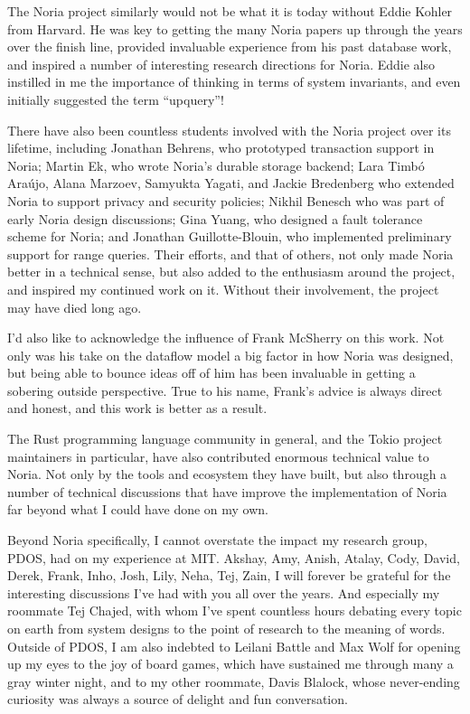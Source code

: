 
The Noria project similarly would not be what it is today without Eddie Kohler
from Harvard. He was key to getting the many Noria papers up through the years
over the finish line, provided invaluable experience from his past database
work, and inspired a number of interesting research directions for Noria. Eddie
also instilled in me the importance of thinking in terms of system invariants,
and even initially suggested the term ``upquery''!

There have also been countless students involved with the Noria project over its
lifetime, including Jonathan Behrens, who prototyped transaction support in
Noria; Martin Ek, who wrote Noria's durable storage backend; Lara Timb\'{o}
Ara\'{u}jo, Alana Marzoev, Samyukta Yagati, and Jackie Bredenberg who extended
Noria to support privacy and security policies; Nikhil Benesch who was part of
early Noria design discussions; Gina Yuang, who designed a fault tolerance
scheme for Noria; and Jonathan Guillotte-Blouin, who implemented preliminary
support for range queries. Their efforts, and that of others, not only made
Noria better in a technical sense, but also added to the enthusiasm around the
project, and inspired my continued work on it. Without their involvement, the
project may have died long ago.

I'd also like to acknowledge the influence of Frank McSherry on this work. Not
only was his take on the dataflow model a big factor in how Noria was designed,
but being able to bounce ideas off of him has been invaluable in getting a
sobering outside perspective. True to his name, Frank's advice is always direct
and honest, and this work is better as a result.

The Rust programming language community in general, and the Tokio project
maintainers in particular, have also contributed enormous technical value to
Noria. Not only by the tools and ecosystem they have built, but also through a
number of technical discussions that have improve the implementation of Noria
far beyond what I could have done on my own.

Beyond Noria specifically, I cannot overstate the impact my research group,
PDOS, had on my experience at MIT. Akshay, Amy, Anish, Atalay, Cody, David,
Derek, Frank, Inho, Josh, Lily, Neha, Tej, Zain, I will forever be grateful for
the interesting discussions I've had with you all over the years. And especially
my roommate Tej Chajed, with whom I've spent countless hours debating every
topic on earth from system designs to the point of research to the meaning of
words. Outside of PDOS, I am also indebted to Leilani Battle and Max Wolf for
opening up my eyes to the joy of board games, which have sustained me through
many a gray winter night, and to my other roommate, Davis Blalock, whose
never-ending curiosity was always a source of delight and fun conversation.

